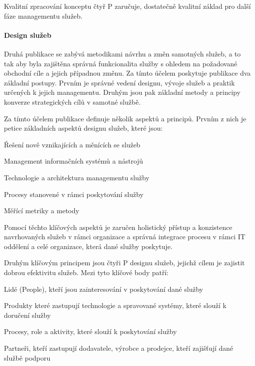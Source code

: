 \documentclass[
  digital,     %
  twoside,     %
  lof,         %
  lot,         %
]{fithesis4}
\begin{document}
Kvalitní zpracování konceptu čtyř P zaručuje, dostatečně kvalitní základ pro další fáze managementu služeb.


\paragraph{Design služeb}
Druhá publikace se zabývá metodikami návrhu a změn samotných služeb, a to tak aby byla zajištěna správná funkcionalita služby s ohledem na požadované obchodní cíle a jejich případnou změnu. Za tímto účelem poskytuje publikace dva základní postupy. Prvním je správné vedení designu, vývoje služeb a praktik určených k jejich managementu. Druhým jsou pak základní metody a principy konverze strategických cílů v samotné službě.\parencite[s.~21]{Carlidge2007}

Za tímto účelem publikace definuje několik aspektů a principů. Prvním z nich je petice základních aspektů designu služeb, které jsou: \parencite[s.~22]{Carlidge2007}
\begin{compactitem}
    \item Řešení nově vznikajících a měnících se služeb
    \item Management informačních systémů a nástrojů
    \item Technologie a architektura managementu služby
    \item Procesy stanovené v rámci poskytování služby
    \item Měřící metriky a metody
\end{compactitem}
Pomocí těchto klíčových aspektů je zaručen holistický přístup a konzistence navrhovaných služeb v rámci organizace a správná integrace procesu v rámci IT oddělení a celé organizace, která dané služby poskytuje. \parencite[s.~22]{Carlidge2007}

Druhým klíčovým principem jsou čtyři P designu služeb, jejichž cílem je zajistit dobrou efektivitu služeb. Mezi tyto klíčové body patří:\parencite[s.~22]{Carlidge2007}

\begin{compactitem}
    \item Lidé (People), kteří jsou zainteresování v poskytování dané služby
    \item Produkty které zastupují technologie a spravované systémy, které slouží k doručení služby
    \item Procesy, role a aktivity, které slouží k poskytování služby
    \item Partneři, kteří zastupují dodavatele, výrobce a prodejce, kteří zajišťují dané službě podporu
\end{compactitem}
\end{document}
